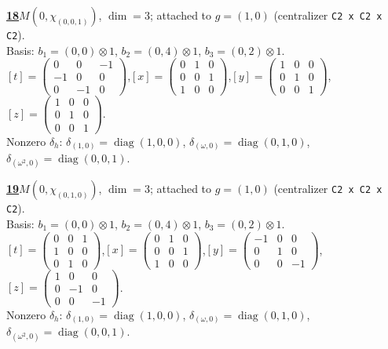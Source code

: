 \begin{samepage}\noindent\textbf{\underline{18}}\quad $M(0,\chi_{(0,0,1)})$, $\dim=3$; attached to $g=(1,0)$ (centralizer \texttt{C2 x C2 x C2}).\\
Basis: $b_{1}=(0,0)\otimes 1$, $b_{2}=(0,4)\otimes 1$, $b_{3}=(0,2)\otimes 1$.\\
$[t]=\left(\begin{smallmatrix} 0 & 0 & -1 \\ -1 & 0 & 0 \\ 0 & -1 & 0 \end{smallmatrix}\right)$,\quad $[x]=\left(\begin{smallmatrix} 0 & 1 & 0 \\ 0 & 0 & 1 \\ 1 & 0 & 0 \end{smallmatrix}\right)$,\quad $[y]=\left(\begin{smallmatrix} 1 & 0 & 0 \\ 0 & 1 & 0 \\ 0 & 0 & 1 \end{smallmatrix}\right)$,\quad $[z]=\left(\begin{smallmatrix} 1 & 0 & 0 \\ 0 & 1 & 0 \\ 0 & 0 & 1 \end{smallmatrix}\right)$.\\
Nonzero $\delta_h$: $\delta_{(1,0)}=\operatorname{diag}(1,0,0)$, $\delta_{(\omega,0)}=\operatorname{diag}(0,1,0)$, $\delta_{(\omega^2,0)}=\operatorname{diag}(0,0,1)$.\end{samepage}
\medskip

\begin{samepage}\noindent\textbf{\underline{19}}\quad $M(0,\chi_{(0,1,0)})$, $\dim=3$; attached to $g=(1,0)$ (centralizer \texttt{C2 x C2 x C2}).\\
Basis: $b_{1}=(0,0)\otimes 1$, $b_{2}=(0,4)\otimes 1$, $b_{3}=(0,2)\otimes 1$.\\
$[t]=\left(\begin{smallmatrix} 0 & 0 & 1 \\ 1 & 0 & 0 \\ 0 & 1 & 0 \end{smallmatrix}\right)$,\quad $[x]=\left(\begin{smallmatrix} 0 & 1 & 0 \\ 0 & 0 & 1 \\ 1 & 0 & 0 \end{smallmatrix}\right)$,\quad $[y]=\left(\begin{smallmatrix} -1 & 0 & 0 \\ 0 & 1 & 0 \\ 0 & 0 & -1 \end{smallmatrix}\right)$,\quad $[z]=\left(\begin{smallmatrix} 1 & 0 & 0 \\ 0 & -1 & 0 \\ 0 & 0 & -1 \end{smallmatrix}\right)$.\\
Nonzero $\delta_h$: $\delta_{(1,0)}=\operatorname{diag}(1,0,0)$, $\delta_{(\omega,0)}=\operatorname{diag}(0,1,0)$, $\delta_{(\omega^2,0)}=\operatorname{diag}(0,0,1)$.\end{samepage}
\medskip

